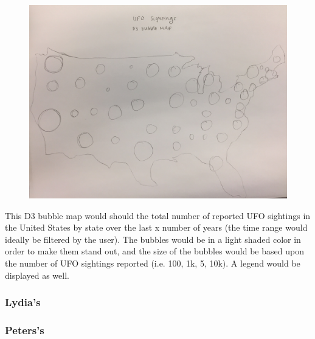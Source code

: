 \documentclass{neu_handout}
\begin{document}
\begin{figure}[h]
\centering
{
\includegraphics[width=0.5\linewidth]{emily2}
}
\end{figure}

This D3 bubble map would should the total number of reported UFO sightings in the United States by state over the last x number of years (the time range would ideally be filtered by the user). The bubbles would be in a light shaded color in order to make them stand out, and the size of the bubbles would be based upon the number of UFO sightings reported (i.e. 100, 1k, 5, 10k). A legend would be displayed as well.

\subsubsection*{Lydia's}

\subsubsection*{Peters's}
\end{document}
